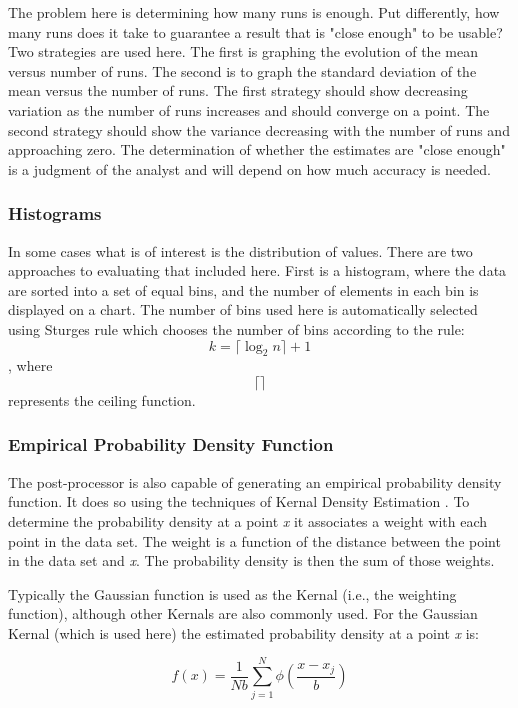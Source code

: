 \documentclass[12pt,twoside]{book}
\begin{document}
The problem here is determining how many runs is enough. Put differently, how many runs does it take to guarantee a result that is "close enough" to be usable? Two strategies are used here. The first is graphing the evolution of the mean versus number of runs. The second is to graph the standard deviation of the mean versus the number of runs. The first strategy should show decreasing variation as the number of runs increases and should converge on a point. The second strategy should show the variance decreasing with the number of runs and approaching zero. The determination of whether the estimates are "close enough" is a judgment of the analyst and will depend on how much accuracy is needed.

\subsubsection{Histograms}

In some cases what is of interest is the distribution of values. There are two approaches to evaluating that  included here. First is a histogram, where the data are sorted into a set of equal bins, and the number of elements in each bin is displayed on a chart. The number of bins used here is automatically selected using Sturges rule \cite{Sturges_1926} which chooses the number of bins according to the rule: \[k = \lceil \log_2 n \rceil + 1\], where  \[ \lceil \rceil\] represents the ceiling function.

\subsubsection{Empirical Probability Density Function}

The post-processor is also capable of generating an empirical probability density function. It does so using the techniques of Kernal Density Estimation \cite{Haste_2009}. To determine the probability density at a point \textit{x} it associates a weight with each point in the data set. The weight is a function of the distance between the point in the data set and \textit{x}. The probability density is then the sum of those weights.

Typically the Gaussian function is used as the Kernal (i.e., the weighting function), although other Kernals are also commonly used. For the Gaussian Kernal (which is used here) the estimated probability density at a point \textit{x} is:

\[f(x) = \frac{1}{Nb}\sum_{j=1}^{N} \phi\left(\frac{x - x_j}{b} \right) \]
\end{document}
